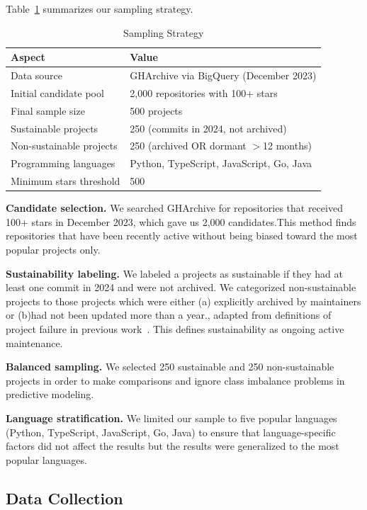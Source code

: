 \documentclass[conference]{IEEEtran}
\begin{document}
Table~\ref{tab:sampling} summarizes our sampling strategy.

\begin{table}[htbp]
\centering
\caption{Sampling Strategy}
\label{tab:sampling}
\begin{tabular}{@{}ll@{}}
\toprule
\textbf{Aspect} & \textbf{Value} \\
\midrule
Data source & GHArchive via BigQuery (December 2023) \\
Initial candidate pool & 2,000 repositories with 100+ stars \\
Final sample size & 500 projects \\
Sustainable projects & 250 (commits in 2024, not archived) \\
Non-sustainable projects & 250 (archived OR dormant $>$12 months) \\
Programming languages & Python, TypeScript, JavaScript, Go, Java \\
Minimum stars threshold & 500 \\
\bottomrule
\end{tabular}
\end{table}

\textbf{Candidate selection.} We searched GHArchive for repositories that received 100+ stars in December 2023, which gave us 2,000 candidates.This method finds repositories that have been recently active without being biased toward the most popular projects only.

\textbf{Sustainability labeling.} We labeled a projects as sustainable if they had at least one commit in 2024 and were not archived. We categorized non-sustainable projects to those projects which were either (a) explicitly archived by maintainers or (b)had not been updated more than a year., adapted from definitions of project failure in previous work~\cite{coelho2017}. This defines sustainability as ongoing active maintenance.

\textbf{Balanced sampling.} We selected 250 sustainable and 250 non-sustainable projects in order to make comparisons and ignore class imbalance problems in predictive  modeling.

\textbf{Language stratification.} We limited our sample to five popular languages (Python, TypeScript, JavaScript, Go, Java) to ensure that language-specific factors did not affect the results but the results were generalized to the most popular languages.

\subsection{Data Collection}
\end{document}
